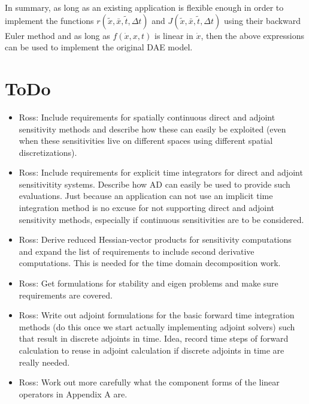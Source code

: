 \documentclass[pdf,ps2pdf,11pt]{SANDreport}
\begin{document}
In summary, as long as an existing application is flexible enough in order to
implement the functions $r(\tilde{x},\bar{x},\tilde{t},\Delta t)$ and
$J(\tilde{x},\bar{x},\tilde{t},\Delta t)$ using their backward Euler method
and as long as $f(\dot{x},x,t)$ is linear in $\dot{x}$, then the above
expressions can be used to implement the original DAE model.

\section{ToDo}

\begin{itemize}
%
{}\item Ross: Include requirements for spatially continuous direct and adjoint
sensitivity methods and describe how these can easily be exploited (even when
these sensitivities live on different spaces using different spatial
discretizations).
%
{}\item Ross: Include requirements for explicit time integrators for direct
and adjoint sensitivitity systems.  Describe how AD can easily be used to
provide such evaluations.  Just because an application can not use an implicit
time integration method is no excuse for not supporting direct and adjoint
sensitivity methods, especially if continuous sensitivities are to be
considered.
%
{}\item Ross: Derive reduced Hessian-vector products for sensitivity
computations and expand the list of requirements to include second derivative
computations.  This is needed for the time domain decomposition work.
%
{}\item Ross: Get formulations for stability and eigen problems and make sure
requirements are covered.
%
{}\item Ross: Write out adjoint formulations for the basic forward
time integration methods (do this once we start actually implementing
adjoint solvers) such that result in discrete adjoints in time.  Idea,
record time steps of forward calculation to reuse in adjoint
calculation if discrete adjoints in time are really needed.
%
{}\item Ross: Work out more carefully what the component forms of the
linear operators in Appendix A are.
%

\end{itemize}
\end{document}
